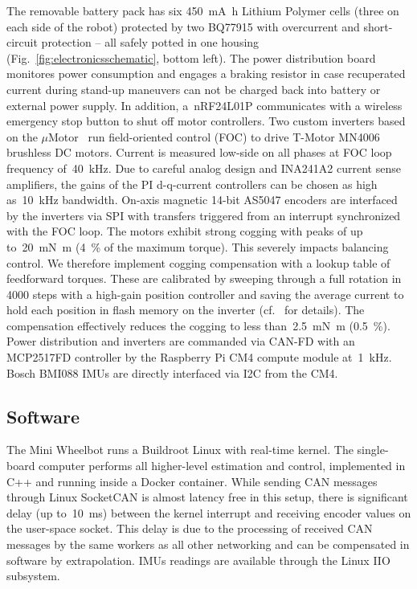 The removable battery pack has six \SI{450}{\milli\ampere\hour} Lithium Polymer cells (three on each side of the robot) protected by two BQ77915 with overcurrent and short-circuit protection -- all safely potted in one housing (Fig.~\ref{fig:electronicsschematic}, bottom left).
The power distribution board monitores power consumption and engages a braking resistor in case recuperated current during stand-up maneuvers can not be charged back into battery or external power supply.
In addition, a~nRF24L01P communicates with a wireless emergency stop button to shut off motor controllers.
Two custom inverters based on the $\mu$Motor~\cite{lehmann2021micro} run field-oriented control (FOC) to drive T-Motor MN4006 brushless DC motors.
Current is measured low-side on all phases at FOC loop frequency of~\SI{40}{\kilo\hertz}.
Due to careful analog design and INA241A2 current sense amplifiers, the gains of the PI d-q-current controllers can be chosen as high as~\SI{10}{\kilo\hertz} bandwidth.
On-axis magnetic 14-bit AS5047 encoders are interfaced by the inverters via SPI with transfers triggered from an interrupt synchronized with the FOC loop.
The motors exhibit strong cogging with peaks of up to~\SI{20}{\milli\newton\meter} (\SI{4}{\percent} of the maximum torque).
This severely impacts balancing control.
We therefore implement cogging compensation with a lookup table of feedforward torques.
These are calibrated by sweeping through a full rotation in \num{4000} steps with a high-gain position controller and saving the average current to hold each position in flash memory on the inverter (cf.~\cite{piccoli2016anticogging} for details).
The compensation effectively reduces the cogging to less than~\SI{2.5}{\milli\newton\meter} (\SI{0.5}{\percent}).
Power distribution and inverters are commanded via CAN-FD with an MCP2517FD controller by the Raspberry Pi CM4 compute module at~\SI{1}{\kilo\hertz}.
Bosch BMI088 IMUs are directly interfaced via I2C from the CM4.

\subsection{Software}
The Mini Wheelbot runs a Buildroot Linux with real-time kernel.
The single-board computer performs all higher-level estimation and control, implemented in C++ and running inside a Docker container.
While sending CAN messages through Linux SocketCAN is almost latency free in this setup, there is significant delay (up to~\SI{10}{\milli\second}) between the kernel interrupt and receiving encoder values on the user-space socket.
This delay is due to the processing of received CAN messages by the same workers as all other networking and can be compensated in software by extrapolation.
IMUs readings are available through the Linux IIO subsystem.
